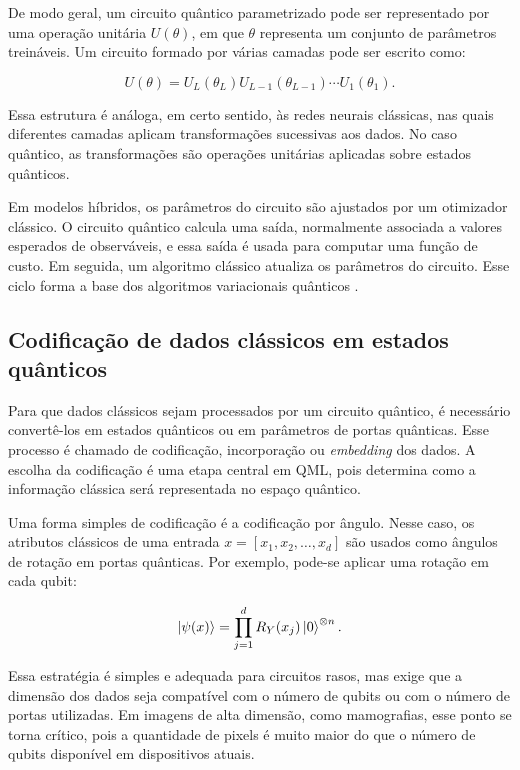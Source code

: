 \documentclass[
    12pt,
    openright,
    oneside,
    a4paper,
    english,
    brazil
]{abntex2}
\begin{document}
De modo geral, um circuito quântico parametrizado pode ser representado por uma operação unitária \(U(\theta)\), em que \(\theta\) representa um conjunto de parâmetros treináveis. Um circuito formado por várias camadas pode ser escrito como:

\[
U(\theta) =
U_L(\theta_L)
U_{L-1}(\theta_{L-1})
\cdots
U_1(\theta_1).
\]

Essa estrutura é análoga, em certo sentido, às redes neurais clássicas, nas quais diferentes camadas aplicam transformações sucessivas aos dados. No caso quântico, as transformações são operações unitárias aplicadas sobre estados quânticos.

Em modelos híbridos, os parâmetros do circuito são ajustados por um otimizador clássico. O circuito quântico calcula uma saída, normalmente associada a valores esperados de observáveis, e essa saída é usada para computar uma função de custo. Em seguida, um algoritmo clássico atualiza os parâmetros do circuito. Esse ciclo forma a base dos algoritmos variacionais quânticos \cite{cerezo2021variational}.

\subsection{Codificação de dados clássicos em estados quânticos}

Para que dados clássicos sejam processados por um circuito quântico, é necessário convertê-los em estados quânticos ou em parâmetros de portas quânticas. Esse processo é chamado de codificação, incorporação ou \textit{embedding} dos dados. A escolha da codificação é uma etapa central em QML, pois determina como a informação clássica será representada no espaço quântico.

Uma forma simples de codificação é a codificação por ângulo. Nesse caso, os atributos clássicos de uma entrada \(x = [x_1, x_2, \ldots, x_d]\) são usados como ângulos de rotação em portas quânticas. Por exemplo, pode-se aplicar uma rotação em cada qubit:

\[
\ket{\psi(x)}
=
\prod_{j=1}^{d}
R_Y(x_j)
\ket{0}^{\otimes n}.
\]

Essa estratégia é simples e adequada para circuitos rasos, mas exige que a dimensão dos dados seja compatível com o número de qubits ou com o número de portas utilizadas. Em imagens de alta dimensão, como mamografias, esse ponto se torna crítico, pois a quantidade de pixels é muito maior do que o número de qubits disponível em dispositivos atuais.
\end{document}

